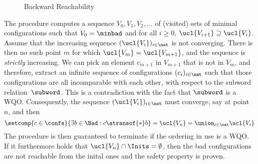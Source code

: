 
\begingroup%
\setlength\intextsep{\dazintextsep}
\begin{figure}[htb]
  \centering
  \caption{Backward Reachability}
  \label{figure:backward:reachability}
\end{figure}
\endgroup

%
%
The procedure computes a sequence $V_0, V_1, V_2, \ldots$ of (visited)
sets of minimal configurations such that $V_0=\minbad$ and for all
$i\geq 0$, $\ucl{V_{i+1}}\supseteq \ucl{V_i}$.
%
Assume that the increasing sequence $(\ucl{V_i})_{i\in\nat}$ is not
converging. There is then no such point $m$ for which $\ucl{V_{m}} =
\ucl{V_{m+1}}$, and the sequence is \emph{strictly} increasing. We can
pick an element $c_{m+1}$ in $V_{m+1}$ that is not in $V_{m}$, and
therefore, extract an infinite sequence of configurations
$(c_i)_{i\in\nat}$ such that those configurations are all incomparable
with each other, with respect to the subword relation~$\subword$.
%
This is a contradiction with the fact that $\subword$ is a WQO.
% 
Consequently, the sequence $(\ucl{V_i})_{i\in\nat}$ must converge, say
at point $n$, and then %
$$
\setcomp{c\in\confs}{\exists b\in \Bad : c \atransof{*} b} =
\ucl{V_n} = \union_{i\in\nat}\ucl{V_i}
$$
The procedure is then guaranteed to terminate if the ordering in use
is a WQO. If it furthermore holds that
$\ucl{V_n}\cap\Inits=\emptyset$, then the bad configurations are not
reachable from the inital ones and the safety property is proven.
